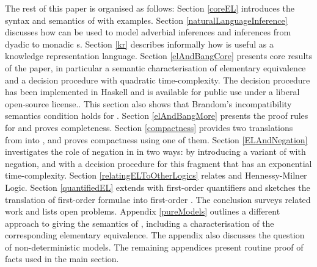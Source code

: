 \NI The rest of this paper is organised as follows: Section
\ref{coreEL} introduces the syntax and semantics of \cathoristic{} with
examples. Section \ref{naturalLanguageInference} discusses how
\cathoristic{} can be used to model adverbial inferences and inferences
from dyadic to monadic s.  Section \ref{kr} describes
informally how \cathoristic{} is useful as a knowledge representation
language.  Section \ref{elAndBangCore} presents core results of the
paper, in particular a semantic characterisation of elementary
equivalence and a decision procedure with quadratic time-complexity. The
decision procedure has been implemented in Haskell and is available
for public use \cite{HaskellImplementation} under a liberal
open-source license..  This
section also shows that Brandom's incompatibility semantics condition
holds for \cathoristic{}.  Section \ref{elAndBangMore} presents the
proof rules for \cathoristic{} and proves completeness. Section
\ref{compactness} provides two translations from \cathoristic{} into
\fol{}, and proves compactness using one of them.  Section
\ref{ELAndNegation} investigates the role of negation in \cathoristic{}
in two ways: by introducing a variant of \cathoristic{} with negation,
and with a decision procedure for this fragment that has an
exponential time-complexity.  Section \ref{relatingELToOtherLogics}
relates \cathoristic{} and Hennessy-Milner Logic.  Section
\ref{quantifiedEL} extends \cathoristic{} with first-order quantifiers
and sketches the translation of first-order formulae into first-order
\cathoristic{}. The conclusion surveys related work and lists open
problems.  Appendix \ref{pureModels} outlines a different approach to
giving the semantics of \cathoristic{}, including a characterisation of
the corresponding elementary equivalence. The appendix also discusses
the question of non-deterministic models. The remaining appendices
present routine proof of facts used in the main section.
